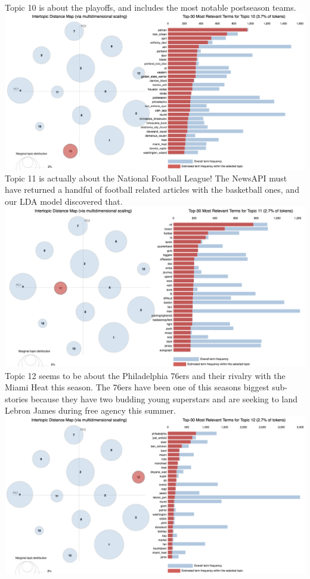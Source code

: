 \documentclass[11pt]{article}
\begin{document}
Topic 10 is about the playoffs, and includes the most notable postseason teams. \\
\includegraphics[width=470pt]{10.png} \\

Topic 11 is actually about the National Football League!  The NewsAPI must have returned a handful of football related articles with the basketball ones, and our LDA model discovered that. \\
\includegraphics[width=470pt]{11.png} \\

Topic 12 seems to be about the Philadelphia 76ers and their rivalry with the Miami Heat this season. The 76ers have been one of this seasons biggest sub-stories because they have two budding young superstars and are seeking to land Lebron James during free agency this summer.\\
\includegraphics[width=470pt]{12.png} \\
\end{document}
